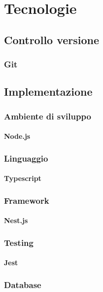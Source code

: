 \chapter{Tecnologie}
\kant[5]

\section{Controllo versione}
\subsection{Git}
\kant[5]


\section{Implementazione}
\subsection{Ambiente di sviluppo}
\subsubsection{Node.js}
\kant[5]

\subsection{Linguaggio}
\subsubsection{Typescript}
\kant[5]

\subsection{Framework}
\subsubsection{Nest.js}
\kant[5]

\subsection{Testing}
\subsubsection{Jest}
\kant[5]

\subsection{Database}
